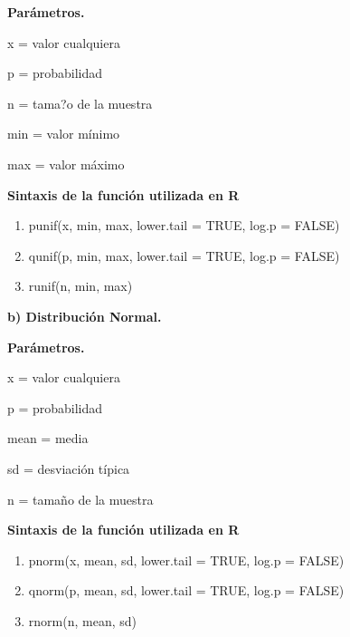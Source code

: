 \documentclass[12pt,letterpaper]{article}\usepackage[]{graphicx}\usepackage[]{color}
\begin{document}
\begin{itemize}
  \item \textbf{Par\'ametros.}
  \begin{center}
\item x = valor cualquiera
\item p = probabilidad
\item n = tama?o de la muestra 
\item min = valor m\'inimo
\item max = valor m\'aximo
\end{center}

\item \textbf{Sintaxis de la funci\'on utilizada en R}
\begin{enumerate}
  \item punif(x, min, max, lower.tail = TRUE, log.p = FALSE)
  \item qunif(p, min, max, lower.tail = TRUE, log.p = FALSE) 
  \item runif(n, min, max) 
\end{enumerate}
\end{itemize}

\begin{description}
  \item \textbf{b) Distribuci\'on Normal.}
\end{description}

\begin{itemize}
  \item \textbf{Par\'ametros.}
  \begin{center}
\item x = valor cualquiera
\item p = probabilidad
\item mean = media
\item sd = desviaci\'on t\'ipica
\item n = tama\~no de la muestra
\end{center}
\item \textbf{Sintaxis de la funci\'on utilizada en R}
\begin{enumerate}
  \item pnorm(x, mean, sd, lower.tail = TRUE, log.p = FALSE) 
  \item qnorm(p, mean, sd, lower.tail = TRUE, log.p = FALSE) 
  \item rnorm(n, mean, sd)  
\end{enumerate}
\end{itemize}
\end{document}
